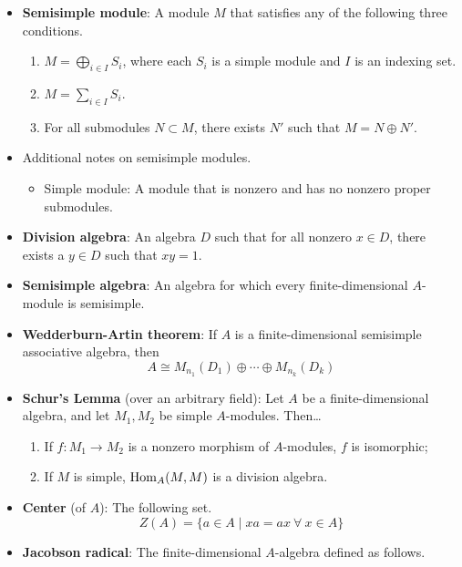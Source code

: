 \documentclass[../notes.tex]{subfiles}
\begin{document}
\begin{itemize}
    \item \textbf{Semisimple module}: A module $M$ that satisfies any of the following three conditions.
    \begin{enumerate}
        \item $M=\bigoplus_{i\in I}S_i$, where each $S_i$ is a simple module and $I$ is an indexing set.
        \item $M=\sum_{i\in I}S_i$.
        \item For all submodules $N\subset M$, there exists $N'$ such that $M=N\oplus N'$.
    \end{enumerate}
    \item Additional notes on semisimple modules.
    \begin{itemize}
        \item Simple module: A module that is nonzero and has no nonzero proper submodules.
    \end{itemize}
    \item \textbf{Division algebra}: An algebra $D$ such that for all nonzero $x\in D$, there exists a $y\in D$ such that $xy=1$.
    \item \textbf{Semisimple algebra}: An algebra for which every finite-dimensional $A$-module is semisimple.
    \item \textbf{Wedderburn-Artin theorem}: If $A$ is a finite-dimensional semisimple associative algebra, then
    \begin{equation*}
        A \cong M_{n_1}(D_1)\oplus\cdots\oplus M_{n_k}(D_k)
    \end{equation*}
    \item \textbf{Schur's Lemma} (over an arbitrary field): Let $A$ be a finite-dimensional algebra, and let $M_1,M_2$ be simple $A$-modules. Then\dots
    \begin{enumerate}
        \item If $f:M_1\to M_2$ is a nonzero morphism of $A$-modules, $f$ is isomorphic;
        \item If $M$ is simple, $\operatorname{Hom}_A(M,M)$ is a division algebra.
    \end{enumerate}
    \item \textbf{Center} (of $A$): The following set.
    \begin{equation*}
        Z(A) = \{a\in A\mid xa=ax\ \forall\ x\in A\}
    \end{equation*}
    \item \textbf{Jacobson radical}: The finite-dimensional $A$-algebra defined as follows.
    \begin{equation*}

\end{equation*}
\end{itemize}
\end{document}
